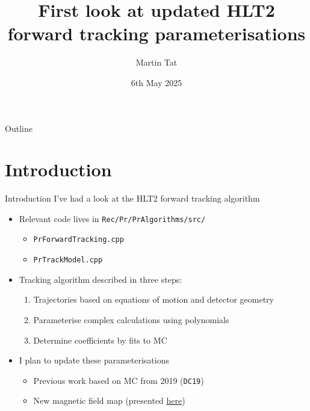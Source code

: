 \documentclass[xcolor={dvipsnames}]{beamer}
\title[RTA WP2 meeting]{First look at updated HLT2 forward tracking parameterisations}
\author[Martin Tat]{Martin Tat}
\institute[Heidelberg]{Heidelberg University}
\date{6th May 2025}
\begin{document}
\begin{frame}
  \titlepage
\end{frame}

\begin{frame}{Outline}
  \tableofcontents
\end{frame}

\section{Introduction}

\begin{frame}{Introduction}
  \vspace{0.0cm}
  {\Large I've had a look at the HLT2 forward tracking algorithm}
  \vspace{0.5cm}
  \begin{itemize}
    \setlength\itemsep{1.0em}
    \item{Relevant code lives in \texttt{Rec/Pr/PrAlgorithms/src/}}
    \begin{itemize}
      \item{\texttt{PrForwardTracking.cpp}}
      \item{\texttt{PrTrackModel.cpp}}
    \end{itemize}
    \item{Tracking algorithm described in three steps:}
    \begin{enumerate}
      \item{Trajectories based on equations of motion and detector geometry}
      \item{Parameterise complex calculations using polynomials}
      \item{Determine coefficients by fits to MC}
    \end{enumerate}
    \item{I plan to update these parameterisations}
    \begin{itemize}
      \item{Previous work based on MC from 2019 (\texttt{DC19})}
      \item{New magnetic field map (presented \href{https://indico.cern.ch/event/1539235/\#3-update-magnetic-field-map}{here})}
    \end{itemize}
  \end{itemize}
\end{frame}
\end{document}
